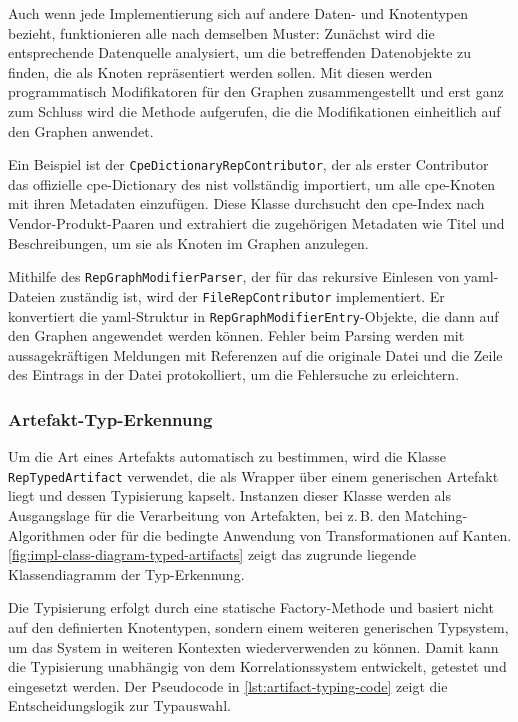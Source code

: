 Auch wenn jede Implementierung sich auf andere Daten- und Knotentypen bezieht, funktionieren alle nach demselben Muster:
Zunächst wird die entsprechende Datenquelle analysiert, um die betreffenden Datenobjekte zu finden, die als Knoten repräsentiert werden sollen.
Mit diesen werden programmatisch Modifikatoren für den Graphen zusammengestellt und erst ganz zum Schluss wird die Methode aufgerufen, die die Modifikationen einheitlich auf den Graphen anwendet.

Ein Beispiel ist der \texttt{CpeDictionaryRepContributor}, der als erster Contributor das offizielle \acrshort{cpe}-Dictionary des \acrshort{nist} vollständig importiert, um alle \acrshort{cpe}-Knoten mit ihren Metadaten einzufügen.
Diese Klasse durchsucht den \acrshort{cpe}-Index nach Vendor-Produkt-Paaren und extrahiert die zugehörigen Metadaten wie Titel und Beschreibungen, um sie als Knoten im Graphen anzulegen.

Mithilfe des \texttt{RepGraphModifierParser}, der für das rekursive Einlesen von \acrshort{yaml}-Dateien zuständig ist, wird der \texttt{FileRepContributor} implementiert.
Er konvertiert die \acrshort{yaml}-Struktur in \texttt{RepGraphModifierEntry}-Objekte, die dann auf den Graphen angewendet werden können.
Fehler beim Parsing werden mit aussagekräftigen Meldungen mit Referenzen auf die originale Datei und die Zeile des Eintrags in der Datei protokolliert, um die Fehlersuche zu erleichtern.

\subsubsection{Artefakt-Typ-Erkennung}\label{subsubsec:impl-artifact-type-detection}

Um die Art eines Artefakts automatisch zu bestimmen, wird die Klasse \texttt{RepTypedArtifact} verwendet, die als Wrapper über einem generischen Artefakt liegt und dessen Typisierung kapselt.
Instanzen dieser Klasse werden als Ausgangslage für die Verarbeitung von Artefakten, bei z.\,B. den Matching-Algorithmen oder für die bedingte Anwendung von Transformationen auf Kanten.
\autoref{fig:impl-class-diagram-typed-artifacts} zeigt das zugrunde liegende Klassendiagramm der Typ-Erkennung.

Die Typisierung erfolgt durch eine statische Factory-Methode und basiert nicht auf den definierten Knotentypen, sondern einem weiteren generischen Typsystem, um das System in weiteren Kontexten wiederverwenden zu können.
Damit kann die Typisierung unabhängig von dem Korrelationssystem entwickelt, getestet und eingesetzt werden.
Der Pseudocode in \autoref{lst:artifact-typing-code} zeigt die Entscheidungslogik zur Typauswahl.

